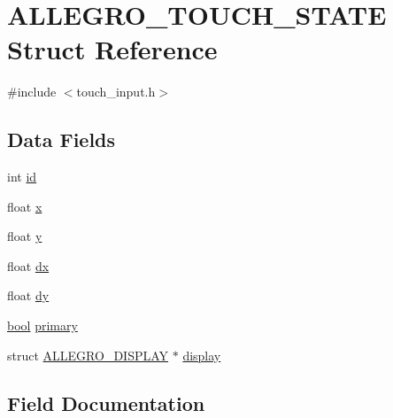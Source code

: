 \hypertarget{struct_a_l_l_e_g_r_o___t_o_u_c_h___s_t_a_t_e}{}\section{A\+L\+L\+E\+G\+R\+O\+\_\+\+T\+O\+U\+C\+H\+\_\+\+S\+T\+A\+TE Struct Reference}
\label{struct_a_l_l_e_g_r_o___t_o_u_c_h___s_t_a_t_e}


{\ttfamily \#include $<$touch\+\_\+input.\+h$>$}

\subsection*{Data Fields}
\begin{DoxyCompactItemize}
\item 
int \hyperlink{struct_a_l_l_e_g_r_o___t_o_u_c_h___s_t_a_t_e_a0bb28b1cb043283d9d38fde5324412f2}{id}
\item 
float \hyperlink{struct_a_l_l_e_g_r_o___t_o_u_c_h___s_t_a_t_e_a7eac8f1a20a0044e1ec2642adeca3f47}{x}
\item 
float \hyperlink{struct_a_l_l_e_g_r_o___t_o_u_c_h___s_t_a_t_e_acd2fc679d6589ff276fcbf2e87b52730}{y}
\item 
float \hyperlink{struct_a_l_l_e_g_r_o___t_o_u_c_h___s_t_a_t_e_a383b213e2685245b30a0261511ee674c}{dx}
\item 
float \hyperlink{struct_a_l_l_e_g_r_o___t_o_u_c_h___s_t_a_t_e_aeed8ceff764064a793430eadb46589dd}{dy}
\item 
\hyperlink{astdbool_8h_abb452686968e48b67397da5f97445f5b}{bool} \hyperlink{struct_a_l_l_e_g_r_o___t_o_u_c_h___s_t_a_t_e_ae7319ba46a0003c2521c64db572d2656}{primary}
\item 
struct \hyperlink{display_8h_a7516185aa39c086f4bc62bd4bf5858bf}{A\+L\+L\+E\+G\+R\+O\+\_\+\+D\+I\+S\+P\+L\+AY} $\ast$ \hyperlink{struct_a_l_l_e_g_r_o___t_o_u_c_h___s_t_a_t_e_a5eb39240ab6892345d0a8bc54e274d07}{display}
\end{DoxyCompactItemize}


\subsection{Field Documentation}
\mbox{\label{struct_a_l_l_e_g_r_o___t_o_u_c_h___s_t_a_t_e_a5eb39240ab6892345d0a8bc54e274d07}} 
